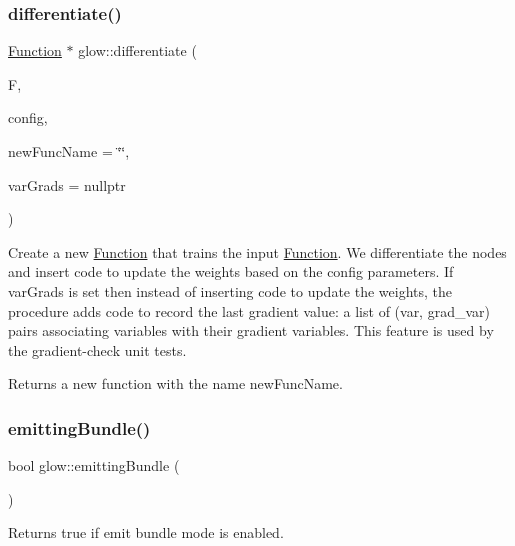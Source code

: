 \subsubsection{\texorpdfstring{differentiate()}{differentiate()}}
{\footnotesize\ttfamily \hyperlink{classglow_1_1_function}{Function} $\ast$ glow\+::differentiate (\begin{DoxyParamCaption}\item[{\hyperlink{classglow_1_1_function}{Function} $\ast$}]{F,  }\item[{const \hyperlink{structglow_1_1_training_config}{Training\+Config} \&}]{config,  }\item[{llvm\+::\+String\+Ref}]{new\+Func\+Name = {\ttfamily \char`\"{}\char`\"{}},  }\item[{Variable\+Gradients\+List $\ast$}]{var\+Grads = {\ttfamily nullptr} }\end{DoxyParamCaption})}

Create a new \hyperlink{classglow_1_1_function}{Function} that \textquotesingle{}trains\textquotesingle{} the input \hyperlink{classglow_1_1_function}{Function}. We differentiate the nodes and insert code to update the weights based on the {\ttfamily config} parameters. If {\ttfamily var\+Grads} is set then instead of inserting code to update the weights, the procedure adds code to record the last gradient value\+: a list of (var, grad\+\_\+var) pairs associating variables with their gradient variables. This feature is used by the gradient-\/check unit tests. \begin{DoxyReturn}{Returns}
a new function with the name {\ttfamily new\+Func\+Name}. 
\end{DoxyReturn}
\mbox{\label{namespaceglow_a2f4b45dc331a5845df9ca8e95503c09b}} 
\subsubsection{\texorpdfstring{emitting\+Bundle()}{emittingBundle()}}
{\footnotesize\ttfamily bool glow\+::emitting\+Bundle (\begin{DoxyParamCaption}{ }\end{DoxyParamCaption})}

\begin{DoxyReturn}{Returns}
true if emit bundle mode is enabled. 
\end{DoxyReturn}
\mbox{\label{namespaceglow_ad5afe057375ea161648698052cdeef25}} 
